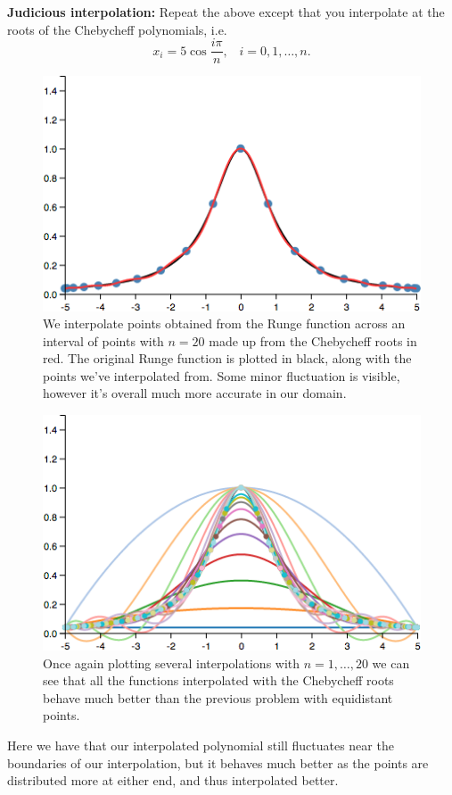 \textbf{Judicious interpolation:} Repeat the above except that you interpolate at the roots of the Chebycheff polynomials, i.e. \[x_i = 5 \cos \frac{i \pi}{n},\;\;\; i=0,1,\dots,n.\]

{\color{blue}

\begin{figure}[H]
\centering
\includegraphics[scale=0.65]{runge-chebycheff.png}
\caption{We interpolate points obtained from the Runge function across
  an interval of points with $n=20$ made up from the Chebycheff roots
  in red. The original Runge function is plotted in black, along with
  the points we've interpolated from. Some minor fluctuation is
  visible, however it's overall much more accurate in our domain.}
\end{figure}

\begin{figure}[H]
\centering
\includegraphics[scale=0.65]{runge-chebycheff-n-1-20.png}
\caption{Once again plotting several interpolations with
  $n=1,\dots,20$ we can see that all the functions interpolated with
  the Chebycheff roots behave much better than the previous problem
  with equidistant points.}
\end{figure}

Here we have that our interpolated polynomial still fluctuates near
the boundaries of our interpolation, but it behaves much better as the
points are distributed more at either end, and thus interpolated better.

}
